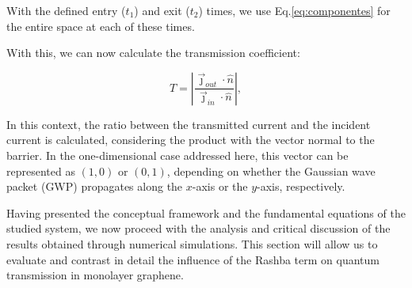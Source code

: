 With the defined entry ($t_1$) and exit ($t_2$) times, we use Eq.\eqref{eq:componentes} for the entire space at each of these times.

With this, we can now calculate the transmission coefficient:

\begin{equation}
    \label{eq:transmissionCoef}
    T = \left| \frac{\vec{\jmath}_{out}\cdot\hat{n}}{\vec{\jmath}_{in}\cdot\hat{n}} \right|,
\end{equation}

\noindent In this context, the ratio between the transmitted current and the incident current is calculated, considering the product with the vector normal to the barrier.
In the one-dimensional case addressed here, this vector can be represented as $(1,0)$ or $(0,1)$, depending on whether the Gaussian wave packet (GWP) propagates along the $x$-axis or the $y$-axis, respectively.

Having presented the conceptual framework and the fundamental equations of the studied system, we now proceed with the analysis and critical discussion of the results obtained through numerical simulations.
This section will allow us to evaluate and contrast in detail the influence of the Rashba term on quantum transmission in monolayer graphene.
